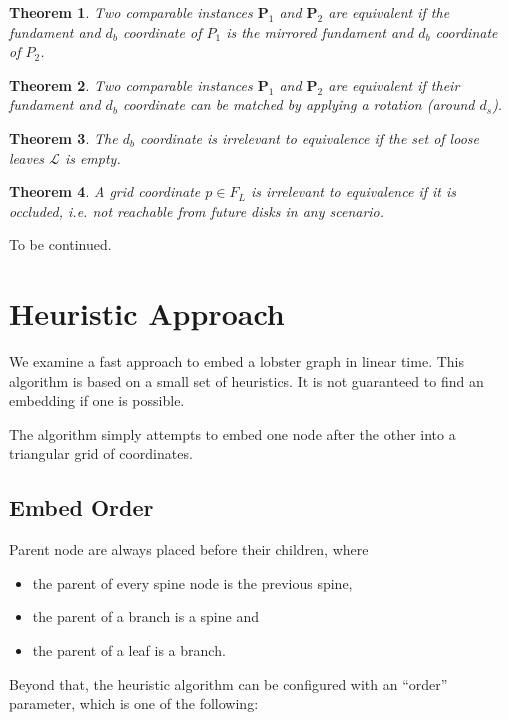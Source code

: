 \documentclass[draft,final]{vutinfth} %
\newtheorem{theorem}{Theorem}
\begin{document}
\begin{theorem}
Two comparable instances $\mathbf P_1$ and $\mathbf P_2$ are equivalent if the fundament and $d_b$ coordinate of $P_1$ is the mirrored fundament and $d_b$ coordinate of $P_2$.
\end{theorem}

\begin{theorem}
Two comparable instances $\mathbf P_1$ and $\mathbf P_2$ are equivalent if their fundament and $d_b$ coordinate can be matched by applying a rotation (around $d_s$).
\end{theorem}

\begin{theorem}
The $d_b$ coordinate is irrelevant to equivalence if the set of loose leaves $\mathcal L$ is empty.
\end{theorem}

\begin{theorem}
A grid coordinate $p \in F_L$ is irrelevant to equivalence if it is \emph{occluded}, i.e. not reachable from future disks in any scenario.
\end{theorem}

To be continued.

\section{Heuristic Approach}

We examine a fast approach to embed a lobster graph in linear time.
This algorithm is based on a small set of heuristics.
It is not guaranteed to find an embedding if one is possible.

The algorithm simply attempts to embed one node after the other into a triangular grid of coordinates.

\subsection{Embed Order}

Parent node are always placed before their children, where

\begin{itemize}
    \item the parent of every spine node is the previous spine,
    \item the parent of a branch is a spine and
    \item the parent of a leaf is a branch.
\end{itemize}

Beyond that, the heuristic algorithm can be configured with an ``order'' parameter, which is one of the following:
\end{document}
